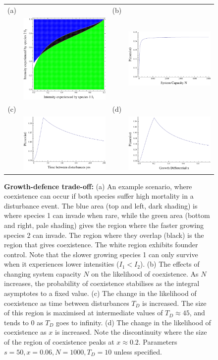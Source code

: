 \begin{figure}[htbp]
\begin{tabular}{cccc}
(a)&&(b)&\\
&\includegraphics[width=2in]{gdx26.pdf}&&\includegraphics[width=2in]{gdtointwN} \\
(c)&&(d)&\\
&\includegraphics[width=2in]{gdtointwTd}&&\includegraphics[width=2in]{gdtointwx}
\end{tabular}
\caption[Consequences of a growth-defence trade-off]{\textbf{Growth-defence trade-off:} (a) An example scenario, where coexistence can occur if both species suffer high mortality in a disturbance event. The blue area (top and left, dark shading) is where species 1 can invade when rare, while the green area (bottom and right, pale shading) gives the region where the faster growing species 2 can invade. The region where they overlap (black) is the region that gives coexistence. The white region exhibits founder control. Note that the slower growing species 1 can only survive when it experiences lower intensities ($I_1<I_2$). (b) The effects of changing system capacity $N$ on the likelihood of coexistence. As $N$ increases, the probability of coexistence stabilises as the integral asymptotes to a fixed value. (c) The change in the likelihood of coexistence as time between disturbances $T_D$ is increased. The size of this region is maximised at intermediate values of $T_D \approx 45$, and tends to 0 as $T_D$ goes to infinity. (d) The change in the likelihood of coexistence as $x$ is increased. Note the discontinuity where  the size of the region of coexistence peaks at $x\approx 0.2$. Parameters $s=50,x=0.06,N=1000,T_D=10$ unless specified.}

\end{figure}
